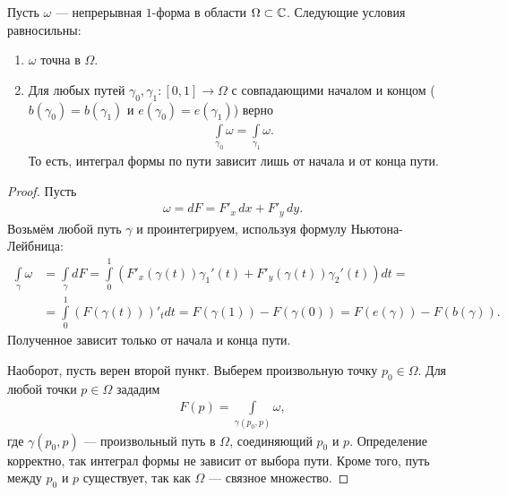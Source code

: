 \begin{thm}
 Пусть $\omega$ --- непрерывная $1$-форма в области $\Omega \subset \mathbb{C}$. Следующие условия равносильны:
 \begin{enumerate}
  \item $\omega$ точна в $\Omega$.
  \item Для любых путей $\gamma_0, \gamma_1 \colon [0,1] \to \Omega$ с совпадающими началом и концом ($b(\gamma_0) = b(\gamma_1)$ и $e(\gamma_0) = e(\gamma_1)$) верно
   \begin{align*}
    \int\limits_{\gamma_0} \omega = \int\limits_{\gamma_1} \omega  
   .\end{align*} То есть, интеграл формы по пути зависит лишь от начала и от конца пути.
 \end{enumerate}
\end{thm}
\begin{proof}
 Пусть
 \begin{align*}
  \omega = d F = F'_x \, dx + F'_y \, dy
 .\end{align*} Возьмём любой путь $\gamma$ и проинтегрируем, используя формулу Ньютона-Лейбница:
 \begin{align*}
   \int\limits_{\gamma} \omega &= \int\limits_{\gamma} dF = \int\limits_{0}^{1} \left( F'_x(\gamma(t)) \gamma_1'(t)  + F'_y(\gamma(t)) \gamma_2'(t) \right) dt = \\
   &= \int\limits_{0}^{1} \left( F(\gamma(t)) \right)'_t dt = F(\gamma(1)) - F(\gamma(0)) = F(e(\gamma)) - F(b(\gamma))
 .\end{align*} Полученное зависит только от начала и конца пути.

 Наоборот, пусть верен второй пункт. Выберем произвольную точку $p_0 \in \Omega$. Для любой точки $p \in \Omega$ зададим
  \begin{align*}
  F(p) = \int\limits_{\gamma(p_0,p)}  \omega
 ,\end{align*} где $\gamma(p_0,p)$ --- произвольный путь в  $\Omega$, соединяющий $p_0$ и $p$.   Определение корректно, так интеграл формы не зависит от выбора пути. Кроме того, путь между $p_0$ и $p$ существует, так как $\Omega$ --- связное множество.


\end{proof}
